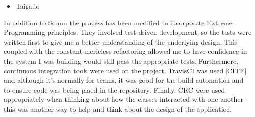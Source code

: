 \begin{itemize}
  \item Taiga.io
\end{itemize}
In addition to Scrum the process has been modified to incorporate Extreme Programming principles. They involved test-driven-development, so the tests were written first to give me a better understanding of the underlying design. This coupled with the constant mericless refactoring allowed me to have confidence in the system I was building would still pass the appropriate tests. Furthermore, continuous integration tools were used on the project. TravisCI was used [CITE] and although it's normally for teams, it was good for the build automation and to ensure code was being plaed in the repository. Finally, CRC were used appropriately when thinking about how the classes interacted with one another - this was another way to help and think about the design of the application.

